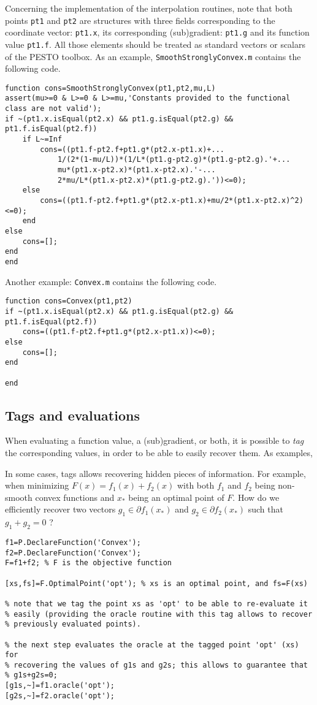 \documentclass[11pt,a4paper]{article}
\begin{document}
Concerning the implementation of the interpolation routines, note that both points \verb?pt1? and \verb?pt2? are structures with three fields corresponding to the coordinate vector: \verb?pt1.x?, its corresponding (sub)gradient: \verb?pt1.g? and its function value \verb?pt1.f?. All those elements should be treated as standard vectors or scalars of the PESTO toolbox. As an example, \verb?SmoothStronglyConvex.m? contains the following code.\\[-1cm]

\begin{lstlisting}
function cons=SmoothStronglyConvex(pt1,pt2,mu,L)
assert(mu>=0 & L>=0 & L>=mu,'Constants provided to the functional class are not valid');
if ~(pt1.x.isEqual(pt2.x) && pt1.g.isEqual(pt2.g) && pt1.f.isEqual(pt2.f))
    if L~=Inf
        cons=((pt1.f-pt2.f+pt1.g*(pt2.x-pt1.x)+...
            1/(2*(1-mu/L))*(1/L*(pt1.g-pt2.g)*(pt1.g-pt2.g).'+...
            mu*(pt1.x-pt2.x)*(pt1.x-pt2.x).'-...
            2*mu/L*(pt1.x-pt2.x)*(pt1.g-pt2.g).'))<=0);
    else
        cons=((pt1.f-pt2.f+pt1.g*(pt2.x-pt1.x)+mu/2*(pt1.x-pt2.x)^2)<=0);
    end    
else
    cons=[];
end
end
\end{lstlisting}

Another example: \verb?Convex.m? contains the following code.\\[-1cm]
\begin{lstlisting}
function cons=Convex(pt1,pt2)
if ~(pt1.x.isEqual(pt2.x) && pt1.g.isEqual(pt2.g) && pt1.f.isEqual(pt2.f))
    cons=((pt1.f-pt2.f+pt1.g*(pt2.x-pt1.x))<=0);
else
    cons=[];
end

end
\end{lstlisting}
\newpage
\subsection{Tags and evaluations}
When evaluating a function value, a (sub)gradient, or both, it is possible to \emph{tag} the corresponding values, in order to be able to easily recover them. As examples,


In some cases, tags allows recovering hidden pieces of information. For example, when minimizing $F(x)=f_1(x)+f_2(x)$ with both $f_1$ and $f_2$ being non-smooth convex functions and $x_*$ being an optimal point of $F$.  How do we efficiently recover two vectors $g_1\in\partial f_1(x_*)$ and $g_2\in\partial f_2(x_*)$ such that $g_1+g_2=0$ ?\\[-1cm]
\begin{lstlisting}
f1=P.DeclareFunction('Convex');
f2=P.DeclareFunction('Convex');
F=f1+f2; % F is the objective function

[xs,fs]=F.OptimalPoint('opt'); % xs is an optimal point, and fs=F(xs)

% note that we tag the point xs as 'opt' to be able to re-evaluate it
% easily (providing the oracle routine with this tag allows to recover
% previously evaluated points).

% the next step evaluates the oracle at the tagged point 'opt' (xs) for
% recovering the values of g1s and g2s; this allows to guarantee that
% g1s+g2s=0;
[g1s,~]=f1.oracle('opt');
[g2s,~]=f2.oracle('opt');
\end{lstlisting}
\end{document}
